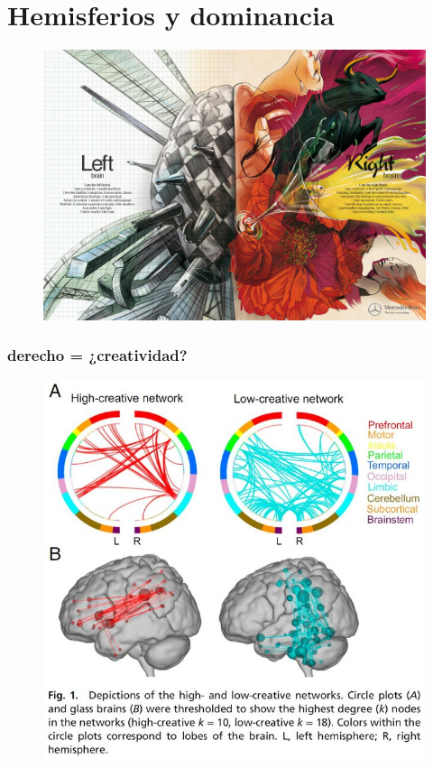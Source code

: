 \documentclass{beamer}
\begin{document}
\section{Hemisferios y dominancia}


\begin{frame}
    \begin{figure}
        \centering
        \includegraphics[width=1\linewidth]{izquierdo-derecho.jpg}
        \label{fig:my_label}
    \end{figure}
\end{frame}


\begin{frame}
	\transfade
	\frametitle{derecho = ¿creatividad?}
	\begin{figure}
		\centering
		\includegraphics[width=0.7\linewidth]{brain_creativity_networks_2018.jpg}
		
		\label{fig:hemisferios}
	\end{figure}
	
\end{frame}
\end{document}
